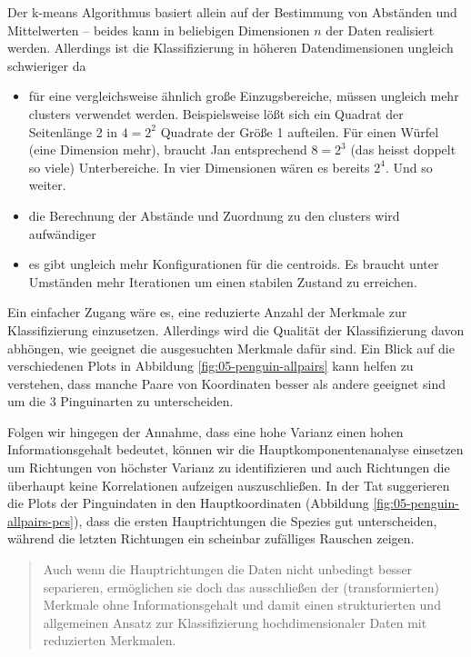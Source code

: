 \documentclass[]{book}
\newenvironment {JHSAYS} [0] {\begin{quote}\color{jhsc}} {\end{quote}}
\theoremstyle{definition}
\theoremstyle{definition}
\theoremstyle{definition}
\theoremstyle{definition}
\theoremstyle{remark}
\begin{document}
Der k-means Algorithmus basiert allein auf der Bestimmung von Abständen und Mittelwerten -- beides kann in beliebigen Dimensionen \(n\) der Daten realisiert werden. Allerdings ist die Klassifizierung in höheren Datendimensionen ungleich schwieriger da

\begin{itemize}
\item
  für eine vergleichsweise ähnlich große Einzugsbereiche, müssen ungleich mehr clusters verwendet werden. Beispielsweise lößt sich ein Quadrat der Seitenlänge 2 in \(4=2^2\) Quadrate der Größe 1 aufteilen. Für einen Würfel (eine Dimension mehr), braucht Jan entsprechend \(8=2^3\) (das heisst doppelt so viele) Unterbereiche. In vier Dimensionen wären es bereits \(2^4\). Und so weiter.
\item
  die Berechnung der Abstände und Zuordnung zu den clusters wird aufwändiger
\item
  es gibt ungleich mehr Konfigurationen für die centroids. Es braucht unter Umständen mehr Iterationen um einen stabilen Zustand zu erreichen.
\end{itemize}

Ein einfacher Zugang wäre es, eine reduzierte Anzahl der Merkmale zur Klassifizierung einzusetzen. Allerdings wird die Qualität der Klassifizierung davon abhöngen, wie geeignet die ausgesuchten Merkmale dafür sind. Ein Blick auf die verschiedenen Plots in Abbildung \ref{fig:05-penguin-allpairs} kann helfen zu verstehen, dass manche Paare von Koordinaten besser als andere geeignet sind um die 3 Pinguinarten zu unterscheiden.

Folgen wir hingegen der Annahme, dass eine hohe Varianz einen hohen Informationsgehalt bedeutet, können wir die Hauptkomponentenanalyse einsetzen um Richtungen von höchster Varianz zu identifizieren und auch Richtungen die überhaupt keine Korrelationen aufzeigen auszuschließen. In der Tat suggerieren die Plots der Pinguindaten in den Hauptkoordinaten (Abbildung \ref{fig:05-penguin-allpairs-pcs}), dass die ersten Hauptrichtungen die Spezies gut unterscheiden, während die letzten Richtungen ein scheinbar zufälliges Rauschen zeigen.

\leavevmode\hypertarget{rem-pca-clustering}{}%
\begin{JHSAYS}
Auch wenn die Hauptrichtungen die Daten nicht unbedingt besser separieren, ermöglichen sie doch das ausschließen der (transformierten) Merkmale ohne Informationsgehalt und damit einen strukturierten und allgemeinen Ansatz zur Klassifizierung hochdimensionaler Daten mit reduzierten Merkmalen.

\end{JHSAYS}
\end{document}
